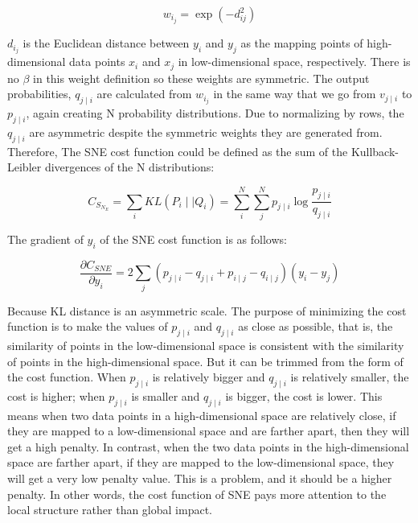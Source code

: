 \begin{equation*}
    {{w_i_j} = \exp {(-d^2_{ij})} }
\end{equation*}

\noindent $d_i_j$ is the Euclidean distance between $y_i$ and $y_j$ as the mapping points of high-dimensional data points $x_i$ and $x_j$ in low-dimensional space, respectively. There is no $\beta$ in this weight definition so these weights are symmetric. The output probabilities, $q_{j\mid i}$ are calculated from $w_i_j$ in the same way that we go from ${v_{j\mid i}}$ to ${p_{j\mid i}}$, again creating N probability distributions. Due to normalizing by rows, the $q_{j\mid i}$ are asymmetric despite the symmetric weights they are generated from.\\

\noindent Therefore, The SNE cost function could be defined as the sum of the Kullback-Leibler divergences of the N distributions:

\begin{equation*}
    {C_S_N_E} = {\sum_i KL(P_i \mid \mid Q_i)} =  { {\sum_i^N} {\sum_j^N} {p_{j\mid i}} \log \frac{p_{j\mid i}}{q_{j\mid i}} }
\end{equation*}

\noindent The gradient of $y_i$ of the SNE cost function is as follows:

\begin{equation*}
\frac{\partial C_{SNE}}{\partial y_i} = 2\sum_j(p_{j \mid i} - q_{j \mid i} + p_{i \mid j} - q_{i \mid j} )(y_i - y_j)
\end{equation*}

\noindent Because KL distance is an asymmetric scale. The purpose of minimizing the cost function is to make the values of $p_{j∣i}$ and $q_{j∣i}$ as close as possible,  that is, the similarity of points in the low-dimensional space is consistent with the similarity of points in the high-dimensional space. But it can be trimmed from the form of the cost function. When $p_{j∣i}$ is relatively bigger and $q_{j∣i}$  is relatively smaller, the cost is higher; when $p_{j∣i}$ is smaller and $q_{j∣i}$ is bigger, the cost is lower. This means when two data points in a high-dimensional space are relatively close, if they are mapped to a low-dimensional space and are farther apart, then they will get a high penalty. In contrast, when the two data points in the high-dimensional space are farther apart, if they are mapped to the low-dimensional space, they will get a very low penalty value. This is a problem, and it should be a higher penalty. In other words, the cost function of SNE pays more attention to the local structure rather than global impact.

